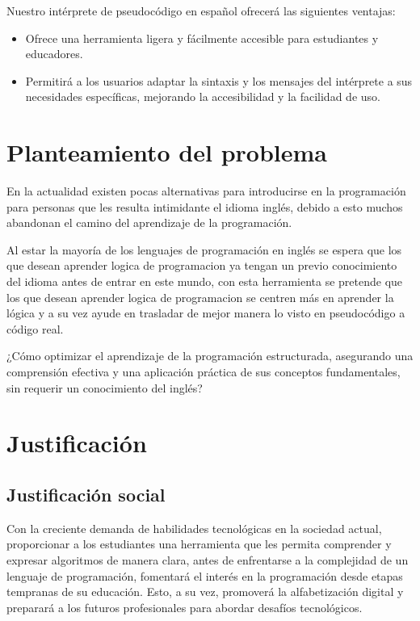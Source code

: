 Nuestro intérprete de pseudocódigo en español ofrecerá las siguientes ventajas:

\vspace{-1em}
\begin{itemize}
  \item Ofrece una herramienta ligera y fácilmente accesible para estudiantes y educadores.
  \item  Permitirá a los usuarios adaptar la sintaxis y los mensajes del intérprete a sus necesidades específicas, mejorando la accesibilidad y la facilidad de uso.  
\end{itemize}
\vspace{-1em}

\section{Planteamiento del problema}
En la actualidad existen pocas alternativas para introducirse en la programación para personas que les resulta intimidante el idioma inglés, debido a esto muchos abandonan el camino del aprendizaje de la programación.

Al estar la mayoría de los lenguajes de programación en inglés se espera que los que desean aprender logica de programacion ya tengan un previo conocimiento del idioma antes de entrar en este mundo, con esta herramienta se pretende que los que desean aprender logica de programacion se centren más en aprender la lógica y a su vez ayude en trasladar de mejor manera lo visto en pseudocódigo a código real.

¿Cómo optimizar el aprendizaje de la programación estructurada, asegurando una comprensión efectiva y una aplicación práctica de sus conceptos fundamentales, sin requerir un conocimiento del inglés?

\section{Justificación}
\subsection{Justificación social}
Con la creciente demanda de habilidades tecnológicas en la sociedad actual, proporcionar a los estudiantes una herramienta que les permita comprender y expresar algoritmos de manera clara, antes de enfrentarse a la complejidad de un lenguaje de programación, fomentará el interés en la programación desde etapas tempranas de su educación. Esto, a su vez, promoverá la alfabetización digital y preparará a los futuros profesionales para abordar desafíos tecnológicos.

